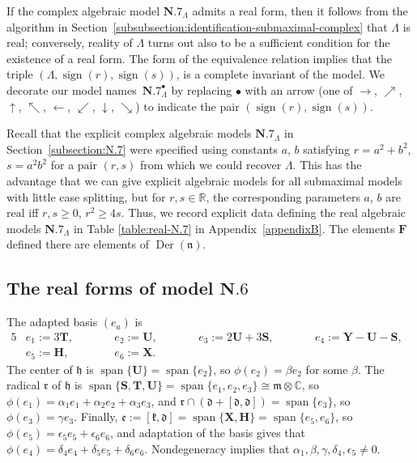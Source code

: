 \documentclass[10pt,a4paper]{amsart}
\DeclareMathOperator{\Der} {Der}
\DeclareMathOperator{\sign}{sign}
\DeclareMathOperator{\spanOperator}{span}
\newcommand{\Span}[1]{\spanOperator\{{#1}\}}
\newcommand{\bbC}{\mathbb{C}}
\newcommand{\bbR}{\mathbb{R}}
\newcommand{\mbF}{\mathbf{F}}
\newcommand{\mbH}{\mathbf{H}}
\newcommand{\mbS}{\mathbf{S}}
\newcommand{\mbT}{\mathbf{T}}
\newcommand{\mbU}{\mathbf{U}}
\newcommand{\mbX}{\mathbf{X}}
\newcommand{\mbY}{\mathbf{Y}}
\newcommand{\mfd} {\mathfrak{d}}
\newcommand{\mfe} {\mathfrak{e}}
\newcommand{\mfh} {\mathfrak{h}}
\newcommand{\mfk} {\mathfrak{k}}
\newcommand{\mfm} {\mathfrak{m}}
\newcommand{\mfn} {\mathfrak{n}}
\newcommand{\mfr} {\mathfrak{r}}
\numberwithin{equation}{section}
\begin{document}
If the complex algebraic model $\mathbf{N.7}_\Lambda$ admits a real form, then it follows from the algorithm in Section~\ref{subsubsection:identification-submaximal-complex} that $\Lambda$ is real; conversely, reality of $\Lambda$ turns out also to be a sufficient condition for the existence of a real form. The form of the equivalence relation implies that the triple $(\Lambda, \sign(r), \sign(s))$, is a complete invariant of the model. We decorate our model names~$\mathbf{N.7}_\Lambda^\bullet$ by replacing $\bullet$ with an arrow (one of $\rightarrow$, $\nearrow$, $\uparrow$, $\nwarrow$, $\leftarrow$, $\swarrow$, $\downarrow$, $\searrow$) to indicate the pair $(\sign(r), \sign(s))$.

Recall that the explicit complex algebraic models $\mathbf{N.7}_\Lambda$ in Section~\ref{subsection:N.7} were specified using constants $a$, $b$ satisfying $r = a^2 + b^2$, $s = a^2 b^2$ for a pair $(r, s)$ from which we could recover $\Lambda$. This has the advantage that we can give explicit algebraic models for all submaximal models with little case splitting, but for $r, s \in \bbR$, the corresponding parameters $a$, $b$ are real iff $r, s \geq 0$, $r^2 \geq 4 s$. Thus, we record explicit data defining the real algebraic models $\mathbf{N.7}_\Lambda$ in Table \ref{table:real-N.7} in Appendix~\ref{appendixB}. The elements $\mbF$ defined there are elements of $\Der(\mfn)$.

\subsection[The real forms of model $\mathbf{N.6}$]{The real forms of model $\boldsymbol{\mathbf{N.6}}$}\label{subsection:N.6-real}
The adapted basis $(e_a)$ is
\begin{alignat*}{5}
&	e_1 := 3 \mbT , \qquad && e_2 := \mbU , \qquad && 	e_3 := 2 \mbU + 3 \mbS , \qquad && 	e_4 := \mbY - \mbU - \mbS , & \\
&	e_5 := \mbH , \qquad && 	e_6 := \mbX . && && &
\end{alignat*}
The center of $\mfh$ is $\Span{\mbU} = \Span{e_2}$, so $\phi(e_2) = \beta e_2$ for some $\beta$. The radical $\mfr$ of $\mfh$ is $\Span{\mbS, \mbT, \mbU} = \Span{e_1, e_2, e_3} \cong \mfm \otimes \bbC$, so $\phi(e_1) = \alpha_1 e_1 + \alpha_2 e_2 + \alpha_3 e_3$, and $\mfr \cap (\mfd + [\mfd, \mfd]) = \Span{e_3}$, so $\phi(e_3) = \gamma e_3$. Finally, $\mfe := [\mfk, \mfd] = \Span{\mbX, \mbH} = \Span{e_5, e_6}$, so $\phi(e_5) = \epsilon_5 e_5 + \epsilon_6 e_6$, and adaptation of the basis gives that $\phi(e_4) = \delta_4 e_4 + \delta_5 e_5 + \delta_6 e_6$. Nondegeneracy implies that $\alpha_1, \beta, \gamma, \delta_4, \epsilon_5 \neq 0$.
\end{document}
